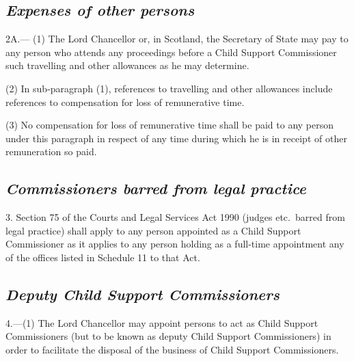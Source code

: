 \documentclass[12pt,a4paper]{article}
\begin{document}

\subsection*{\itshape Expenses of other persons}

2A.---%
%
(1) The Lord Chancellor or, in Scotland, the Secretary of State may pay to any person who attends any proceedings before a Child Support Commissioner such travelling and other allowances as he may determine.

(2) In sub-paragraph (1), references to travelling and other allowances include references to compensation for loss of remunerative time.

(3) No compensation for loss of remunerative time shall be paid to any person under this paragraph in respect of any time during which he is in receipt of other remuneration so paid.


\subsection*{\itshape Commissioners barred from legal practice}

3. Section 75 of the Courts and Legal Services Act 1990 (judges etc.\ barred from legal practice) shall apply to any person appointed as a Child Support Commissioner as it applies to any person holding as a full-time appointment any of the offices listed in Schedule 11 to that Act.

\subsection*{\itshape Deputy Child Support Commissioners}

4.---(1) The Lord Chancellor may appoint persons to act as Child Support Commissioners (but to be known as deputy Child Support Commissioners) in order to facilitate the disposal of the business of Child Support Commissioners.
\end{document}
